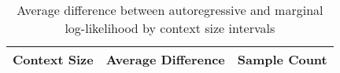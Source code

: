 \begin{table}[htbp]
\centering
\begin{tabular}{lcc}
\toprule
Context Size & Average Difference & Sample Count \\
\midrule
\bottomrule
\end{tabular}
\caption{Average difference between autoregressive and marginal log-likelihood by context size intervals}
\label{tab:context_size_diff}
\end{table}
